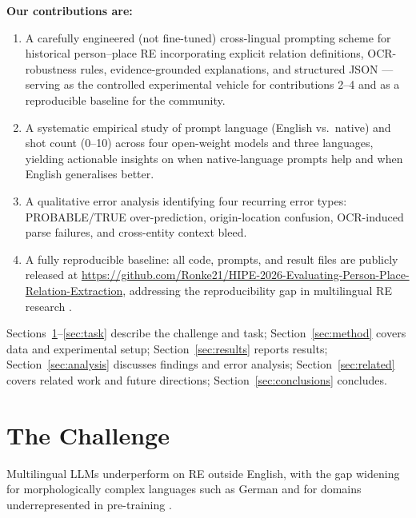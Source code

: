 \documentclass[
]{ceurart}
\theoremstyle{definition}
\begin{document}
\noindent\textbf{Our contributions are:}
\begin{enumerate}[noitemsep]
  \item A carefully engineered (not fine-tuned) cross-lingual prompting scheme for historical person--place RE incorporating explicit relation definitions, OCR-robustness rules, evidence-grounded explanations, and structured JSON --- serving as the controlled experimental vehicle for contributions 2--4 and as a reproducible baseline for the community.
  \item A systematic empirical study of prompt language (English vs.\ native) and shot count (0--10) across four open-weight models and three languages, yielding actionable insights on when native-language prompts help and when English generalises better.
  \item A qualitative error analysis identifying four recurring error types: PROBABLE/TRUE over-prediction, origin-location confusion, OCR-induced parse failures, and cross-entity context bleed.
  \item A fully reproducible baseline: all code, prompts, and result files are publicly released at \url{https://github.com/Ronke21/HIPE-2026-Evaluating-Person-Place-Relation-Extraction}, addressing the reproducibility gap in multilingual RE research \citep{ali2025multilingual}.
\end{enumerate}

Sections~\ref{sec:challenge}--\ref{sec:task} describe the challenge and task; Section~\ref{sec:method} covers data and experimental setup; Section~\ref{sec:results} reports results; Section~\ref{sec:analysis} discusses findings and error analysis; Section~\ref{sec:related} covers related work and future directions; Section~\ref{sec:conclusions} concludes.


\section{The Challenge}\label{sec:challenge}

Multilingual LLMs underperform on RE outside English, with the gap widening for morphologically complex languages such as German and for domains underrepresented in pre-training \citep{joshi-etal-2020-state,keinan2025emotional}.
\end{document}
